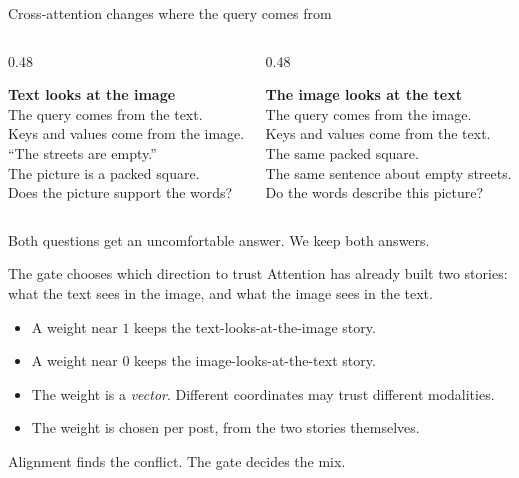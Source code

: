 \begin{frame}{Cross-attention changes where the query comes from}
  \begin{columns}[T,onlytextwidth]
    \begin{column}{0.48\textwidth}
      \colorbox{soft}{\parbox[t]{\dimexpr\linewidth-2\fboxsep}{%
        \textbf{Text looks at the image}\\[0.35em]
        The query comes from the text.\\
        Keys and values come from the image.\\[0.45em]
        ``The streets are empty.''\\
        The picture is a packed square.\\[0.35em]
        Does the picture support the words?}}
    \end{column}
    \begin{column}{0.48\textwidth}
      \colorbox{soft}{\parbox[t]{\dimexpr\linewidth-2\fboxsep}{%
        \textbf{The image looks at the text}\\[0.35em]
        The query comes from the image.\\
        Keys and values come from the text.\\[0.45em]
        The same packed square.\\
        The same sentence about empty streets.\\[0.35em]
        Do the words describe this picture?}}
    \end{column}
  \end{columns}
  \vspace{0.7em}
  Both questions get an uncomfortable answer. We keep both answers.
\end{frame}

\begin{frame}{The gate chooses which direction to trust}
  Attention has already built two stories:
  what the text sees in the image, and what the image sees in the text.
  \vspace{0.7em}
  \begin{itemize}
    \item A weight near $1$ keeps the text-looks-at-the-image story.
    \item A weight near $0$ keeps the image-looks-at-the-text story.
    \item The weight is a \emph{vector}. Different coordinates may trust different modalities.
    \item The weight is chosen per post, from the two stories themselves.
  \end{itemize}
  \vspace{0.45em}
  Alignment finds the conflict. The gate decides the mix.
\end{frame}

